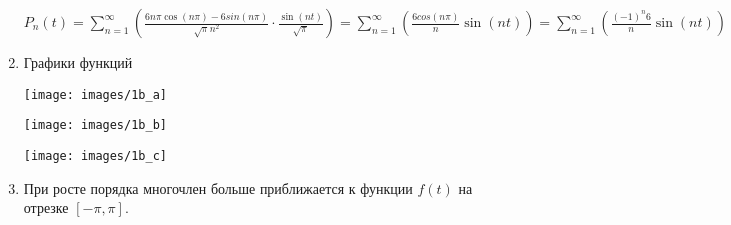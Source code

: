 \begin{enumerate}
    $\displaystyle P_n(t) = \sum^\infty_{n=1} \left(\frac{6n\pi \cos(n\pi) - 6sin(n\pi)}{\sqrt{\pi}n^2} \cdot \frac{\sin (nt)}{\sqrt{\pi}}\right) = \sum^\infty_{n=1} \left(\frac{6cos(n\pi)}{n} \sin(nt)\right) = \sum^\infty_{n=1}\left(\frac{(-1)^n 6}{n} \sin(nt)\right)$
    \vspace{5mm}
    \item Графики функций\:
    \vspace{5mm}

    \texttt{[image: images/1b\_a]}

    \texttt{[image: images/1b\_b]}

    \texttt{[image: images/1b\_c]}

    \vspace{5mm}
    \item При росте порядка многочлен больше приближается к функции $f(t)$ на отрезке $[-\pi, \pi]$.
\end{enumerate}
